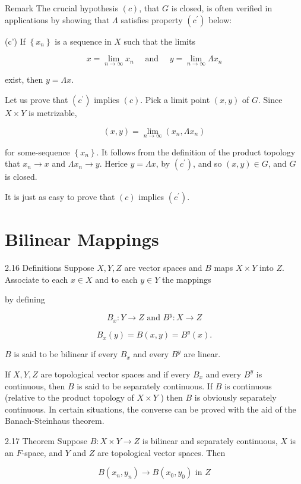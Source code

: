 \documentclass[10pt]{article}
\begin{document}
Remark The crucial hypothesis $(c)$, that $G$ is closed, is often verified in applications by showing that $\Lambda$ satisfies property $\left(c^{\prime}\right)$ below:

(c') If $\left\{x_{n}\right\}$ is a sequence in $X$ such that the limits

$$
x=\lim _{n \rightarrow \infty} x_{n} \quad \text { and } \quad y=\lim _{n \rightarrow \infty} \Lambda x_{n}
$$

exist, then $y=\Lambda x$.

Let us prove that $\left(c^{\prime}\right)$ implies $(c)$. Pick a limit point $(x, y)$ of $G$. Since $X \times Y$ is metrizable,

$$
(x, y)=\lim _{n \rightarrow \infty}\left(x_{n}, \Lambda x_{n}\right)
$$

for some-sequence $\left\{x_{n}\right\}$. It follows from the definition of the product topology that $x_{n} \rightarrow x$ and $\Lambda x_{n} \rightarrow y$. Herice $y=\Lambda x$, by $\left(c^{\prime}\right)$, and so $(x, y) \in G$, and $G$ is
closed.

It is just as easy to prove that $(c)$ implies $\left(c^{\prime}\right)$.

\section{Bilinear Mappings}
2.16 Definitions Suppose $X, Y, Z$ are vector spaces and $B$ maps $X \times Y$ into $Z$. Associate to each $x \in X$ and to each $y \in Y$ the mappings

by defining

$$
B_{x}: Y \rightarrow Z \text { and } B^{y}: X \rightarrow Z
$$

$$
B_{x}(y)=B(x, y)=B^{y}(x) .
$$

$B$ is said to be bilinear if every $B_{x}$ and every $B^{y}$ are linear.

If $X, Y, Z$ are topological vector spaces and if every $B_{x}$ and every $B^{y}$ is continuous, then $B$ is said to be separately continuous. If $B$ is continuous (relative to the product topology of $X \times Y$ ) then $B$ is obviously separately continuous. In certain situations, the converse can be proved with the aid of the Banach-Steinhaus theorem.

2.17 Theorem Suppose $B: X \times Y \rightarrow Z$ is bilinear and separately continuous, $X$ is an $F$-space, and $Y$ and $Z$ are topological vector spaces. Then

$$
B\left(x_{n}, y_{n}\right) \rightarrow B\left(x_{0}, y_{0}\right) \text { in } Z
$$
\end{document}
